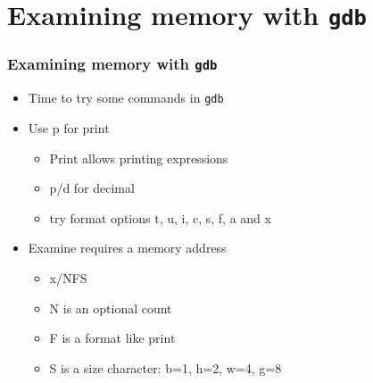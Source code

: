 \documentclass{beamer}
\begin{document}
\section{Examining memory with {\tt gdb}}

\begin{frame}
    \frametitle{Examining memory with {\tt gdb}}
\begin{itemize}
    \item Time to try some commands in {\tt gdb}
    \item Use p for print
    \begin{itemize}
        \item Print allows printing expressions
        \item p/d for decimal
        \item try format options t, u, i, c, s, f, a and x
    \end{itemize}
    \item Examine requires a memory address
    \begin{itemize}
        \item x/NFS
        \item N is an optional count
        \item F is a format like print
        \item S is a size character: b=1, h=2, w=4, g=8
    \end{itemize}
\end{itemize}

\end{frame}
\end{document}
